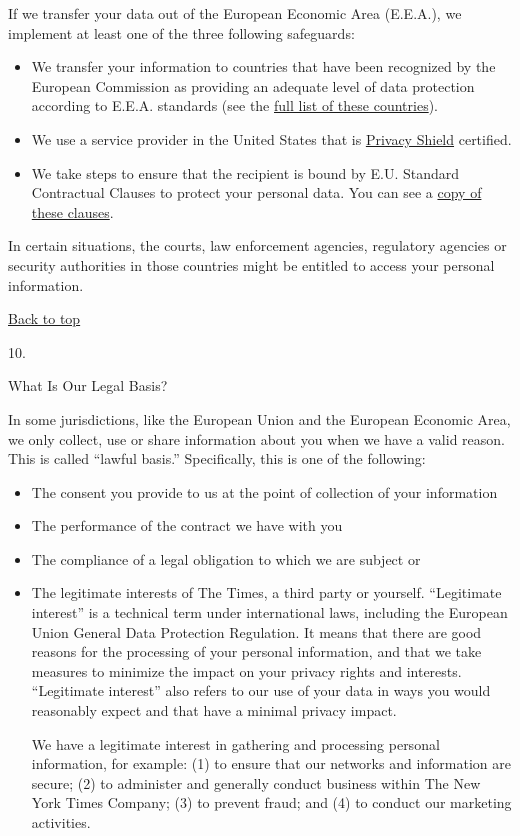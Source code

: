If we transfer your data out of the European Economic Area (E.E.A.), we
implement at least one of the three following safeguards:

\begin{itemize}
\tightlist
\item
  We transfer your information to countries that have been recognized by
  the European Commission as providing an adequate level of data
  protection according to E.E.A. standards (see the
  \href{https://ec.europa.eu/info/law/law-topic/data-protection/international-dimension-data-protection/adequacy-decisions_en}{full
  list of these countries}).
\item
  We use a service provider in the United States that is
  \href{https://www.privacyshield.gov/welcome}{Privacy Shield}
  certified.
\item
  We take steps to ensure that the recipient is bound by E.U. Standard
  Contractual Clauses to protect your personal data. You can see a
  \href{https://ec.europa.eu/info/law/law-topic/data-protection/international-dimension-data-protection/standard-contractual-clauses-scc_en}{copy
  of these clauses}.
\end{itemize}

In certain situations, the courts, law enforcement agencies, regulatory
agencies or security authorities in those countries might be entitled to
access your personal information.

\href{app}{Back to top}

10.

What Is Our Legal Basis?

In some jurisdictions, like the European Union and the European Economic
Area, we only collect, use or share information about you when we have a
valid reason. This is called ``lawful basis.'' Specifically, this is one
of the following:

\begin{itemize}
\item
  The consent you provide to us at the point of collection of your
  information
\item
  The performance of the contract we have with you
\item
  The compliance of a legal obligation to which we are subject or
\item
  The legitimate interests of The Times, a third party or yourself.
  ``Legitimate interest'' is a technical term under international laws,
  including the European Union General Data Protection Regulation. It
  means that there are good reasons for the processing of your personal
  information, and that we take measures to minimize the impact on your
  privacy rights and interests. ``Legitimate interest'' also refers to
  our use of your data in ways you would reasonably expect and that have
  a minimal privacy impact.

  We have a legitimate interest in gathering and processing personal
  information, for example: (1) to ensure that our networks and
  information are secure; (2) to administer and generally conduct
  business within The New York Times Company; (3) to prevent fraud; and
  (4) to conduct our marketing activities.
\end{itemize}

